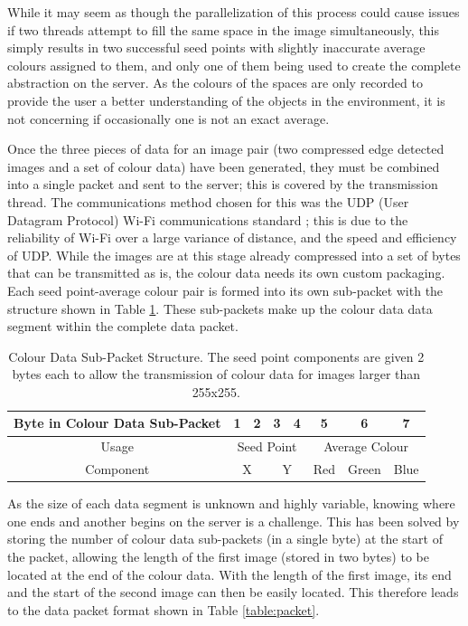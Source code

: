 While it may seem as though the parallelization of this process could cause issues if two threads attempt to fill the same space in the image simultaneously, this simply results in two successful seed points with slightly inaccurate average colours assigned to them, and only one of them being used to create the complete abstraction on the server. As the colours of the spaces are only recorded to provide the user a better understanding of the objects in the environment, it is not concerning if occasionally one is not an exact average.

Once the three pieces of data for an image pair (two compressed edge detected images and a set of colour data) have been generated, they must be combined into a single packet and sent to the server; this is covered by the transmission thread. The communications method chosen for this was the UDP (User Datagram Protocol) Wi-Fi communications standard \cite{postel1980user}; this is due to the reliability of Wi-Fi over a large variance of distance, and the speed and efficiency of UDP. While the images are at this stage already compressed into a set of bytes that can be transmitted as is, the colour data needs its own custom packaging. Each seed point-average colour pair is formed into its own sub-packet with the structure shown in Table \ref{table:colour}. These sub-packets make up the colour data data segment within the complete data packet.

\begin{table}[H]
\centering
\caption{Colour Data Sub-Packet Structure. The seed point components are given 2 bytes each to allow the transmission of colour data for images larger than 255x255.}
\label{table:colour}
\begin{tabular}{|c|c|c|c|c|c|c|c|}
\hline
Byte in Colour Data Sub-Packet & 1          & 2         & 3          & 4         & 5         & 6           & 7         \\ \hline
Usage                          & \multicolumn{4}{c|}{Seed Point}                 & \multicolumn{3}{c|}{Average Colour} \\ \hline
Component                      & \multicolumn{2}{c|}{X} & \multicolumn{2}{c|}{Y} & Red       & Green       & Blue      \\ \hline
\end{tabular}
\end{table}

As the size of each data segment is unknown and highly variable, knowing where one ends and another begins on the server is a challenge. This has been solved by storing the number of colour data sub-packets (in a single byte) at the start of the packet, allowing the length of the first image (stored in two bytes) to be located at the end of the colour data. With the length of the first image, its end and the start of the second image can then be easily located. This therefore leads to the data packet format shown in Table \ref{table:packet}.

